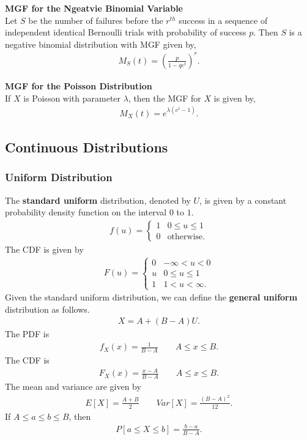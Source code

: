 \documentclass{article}
\numberwithin{theorem}{subsection}
\numberwithin{theorem}{subsubsection}
\numberwithin{lemma}{subsection}
\numberwithin{lemma}{subsubsection}
\theoremstyle{definition}
\numberwithin{definition}{subsection}
\numberwithin{definition}{subsubsection}
\begin{document}
\noindent \textbf{MGF for the Ngeatvie Binomial Variable}\\
Let $S$ be the number of failures before the $r^{th}$ success in a sequence of independent identical Bernoulli trials with probability of success $p$. Then $S$ is a negative binomial distribution with MGF given by,
\begin{gather}
    M_{S}(t) = \left( \frac{p}{1-qe^t} \right)^r.
\end{gather}

\noindent \textbf{MGF for the Poisson Distribution}\\
If $X$ is Poisson with parameter $\lambda$, then the MGF for $X$ is given by,
\begin{gather}
    M_{X}(t) = e^{\lambda(e^t - 1)}.
\end{gather}

\subsection{Continuous Distributions}
\subsubsection{Uniform Distribution}
The \textbf{standard uniform} distribution, denoted by $U$, is given by a constant probability density function on the interval $0$ to $1$.
\begin{gather}
    f(u) = \begin{cases}
                1 & 0 \leq u \leq 1\\
                0 & \text{otherwise}.
            \end{cases}
\end{gather}
The CDF is given by
\begin{gather}
    F(u) = \begin{cases}
                0 & -\infty < u < 0\\
                u & 0 \leq u \leq 1\\
                1 & 1 < u < \infty.
           \end{cases}
\end{gather}
Given the standard uniform distribution, we can define the \textbf{general uniform} distribution as follows.
\begin{gather}
    X = A + (B-A)U.
\end{gather}
The PDF is
\begin{gather}
    f_{X}(x) = \frac{1}{B-A} \quad \quad A \leq x \leq B.
\end{gather}
The CDF is
\begin{gather} 
    F_{X}(x) = \frac{x-A}{B-A} \quad \quad A \leq x \leq B.
\end{gather}
The mean and variance are given by
\begin{gather}
    E[X] = \frac{A+B}{2} \quad \quad Var[X] = \frac{(B-A)^2}{12}.
\end{gather}
If $A \leq a \leq b \leq B$, then 
\begin{gather}
    P[a \leq X \leq b] = \frac{b-a}{B-A}.
\end{gather}
\end{document}
